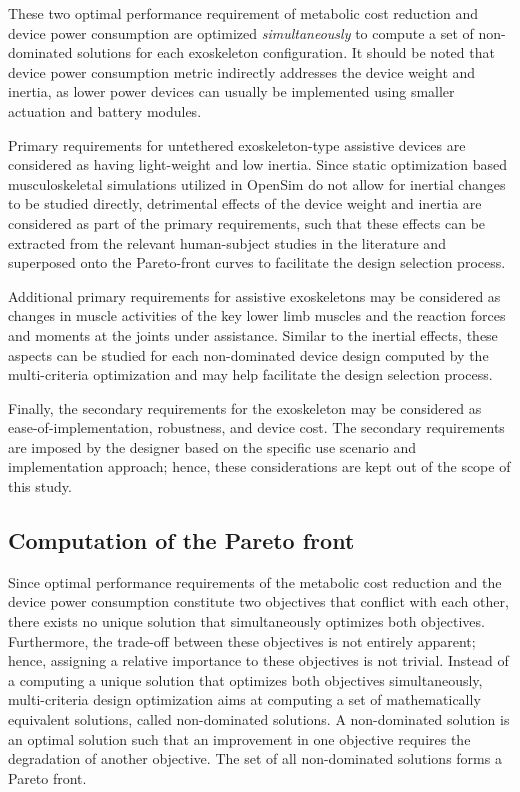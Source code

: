\documentclass[10pt,letterpaper]{article}
\begin{document}
These two optimal performance requirement of metabolic cost reduction and device power consumption are optimized \emph{simultaneously} to compute a set of non-dominated solutions for each exoskeleton configuration. It should be noted that device power consumption metric indirectly addresses the device weight and inertia, as lower power devices can usually be implemented using smaller actuation and battery modules.

Primary requirements for  untethered exoskeleton-type assistive devices are considered as having light-weight and low inertia. Since static optimization based musculoskeletal simulations utilized in OpenSim do not allow for inertial changes to be studied directly, detrimental effects of the device weight and inertia are considered as part of the primary requirements, such that these effects can be extracted from the relevant human-subject studies in the literature and superposed onto the Pareto-front curves to facilitate the design selection process.

Additional primary requirements for assistive exoskeletons may be considered as changes in muscle activities of the key lower limb  muscles and the reaction forces and moments at the joints under assistance. Similar to the inertial effects, these aspects can be studied for each non-dominated device design computed by the multi-criteria optimization and may help facilitate the design selection process.

Finally, the secondary requirements for the exoskeleton may be considered as ease-of-implementation, robustness, and device cost. The secondary requirements are imposed by the designer based on the specific use scenario and implementation approach; hence, these considerations are kept out of the scope of this study.



\subsection*{Computation of the Pareto front}


Since optimal performance requirements of the metabolic cost reduction and the device power consumption constitute two objectives that conflict with each other, there exists no unique solution that simultaneously optimizes both objectives. Furthermore, the trade-off between these objectives is not entirely apparent; hence, assigning a relative importance to these objectives is not trivial. Instead of a computing a unique solution that optimizes both objectives simultaneously, multi-criteria design optimization aims at computing a set of mathematically equivalent solutions, called non-dominated solutions.  A non-dominated solution is an optimal solution such that  an improvement in one objective requires the degradation of another objective. The set of all non-dominated solutions forms a Pareto front.
\end{document}
